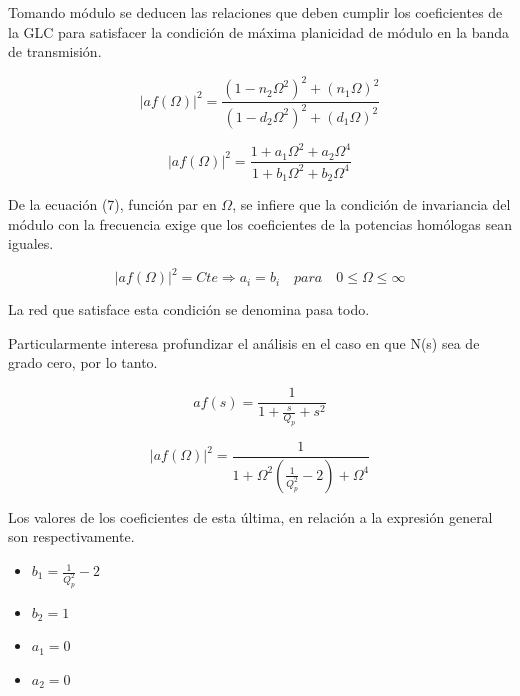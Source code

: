 \bigskip
\hspace{1mm} Tomando módulo se deducen las relaciones que deben cumplir los coeficientes de la GLC para satisfacer la condición de máxima planicidad de módulo en la banda de transmisión.

\begin{equation}
    |af(\Omega)|^2 = \frac{(1 - n_2 \Omega ^2)^2 + (n_1 \Omega)^2}{(1 - d_2 \Omega ^2)^2 + (d_1 \Omega)^2}
\end{equation}

\begin{equation}
    |af(\Omega)|^2 = \frac{1 + a_1 \Omega ^2 + a_2 \Omega^4}{1 + b_1 \Omega ^2 + b_2 \Omega^4}
\end{equation}

\bigskip
\hspace{1mm} De la ecuación (7), función par en \( \Omega \), se infiere que la condición de invariancia del módulo con la frecuencia exige que los coeficientes de la potencias homólogas sean iguales.

\begin{equation}
    |af(\Omega)|^2 = Cte \Longrightarrow a_i = b_i \quad para \quad 0 \leq \Omega \leq \infty
\end{equation}

\bigskip
\hspace{1mm} La red que satisface esta condición se denomina pasa todo.

\bigskip
\hspace{1mm} Particularmente interesa profundizar el análisis en el caso en que N(s) sea de grado cero, por lo tanto.

\begin{equation}
    af(s) = \frac{1}{1 + \frac{s}{Q_p} + s^2}
\end{equation}

\begin{equation}
    |af(\Omega )|^2 = \frac{1}{1 + \Omega ^2 \left(\frac{1}{Q_p^2} - 2\right) + \Omega ^4}
\end{equation}

\bigskip
\hspace{1mm} Los valores de los coeficientes de esta última, en relación a la expresión general son respectivamente.

\begin{itemize}
    \item \( b_1 = \frac{1}{Q_p^2} - 2 \)
    \item \( b_2 = 1 \)
    \item \( a_1 = 0 \)
    \item \( a_2 = 0 \)
\end{itemize}

